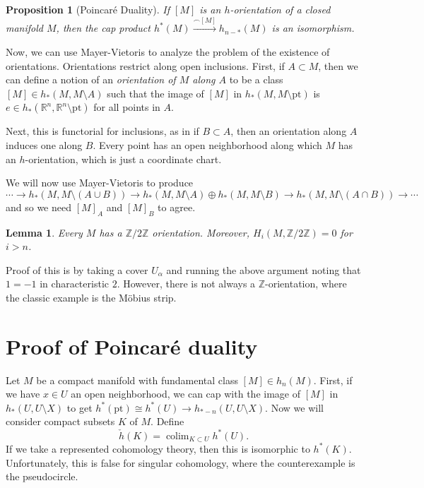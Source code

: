 \documentclass[leqno, openany]{memoir}
\newtheorem{prop}[thm]{Proposition}
\newtheorem{lem}[thm]{Lemma}
\theoremstyle{definition}
\theoremstyle{remark}
\theoremstyle{plain}
\theoremstyle{definition}
\theoremstyle{remark}
\newcommand{\R}{\mathbb{R}}
\newcommand{\Z}{\mathbb{Z}}
\newcommand{\mr}[1]{\mathrm{#1}}
\begin{document}
\begin{prop}[Poincar\'e Duality]
    If $[M]$ is an $h$-orientation of a closed manifold $M$, then the cap product $h^*(M) \xrightarrow{\frown [M]} h_{n-*}(M)$ is an isomorphism.
\end{prop}

Now, we can use Mayer-Vietoris to analyze the problem of the existence of orientations.
Orientations restrict along open inclusions. First, if $A \subset M$, then we can define a notion of an \textit{orientation of $M$ along $A$} to be a class $[M] \in h_*(M, M \setminus A)$ such that the image of $[M]$ in $h_*(M, M \setminus \mr{pt})$ is $e \in h_*(\R^n, \R^n \setminus \mr{pt})$ for all points in $A$.

Next, this is functorial for inclusions, as in if $B \subset A$, then an orientation along $A$ induces one along $B$. Every point has an open neighborhood along which $M$ has an $h$-orientation, which is just a coordinate chart. 

We will now use Mayer-Vietoris to produce
\[ \cdots \to h_*(M, M \setminus (A \cup B)) \to h_*(M, M \setminus A) \oplus h_*(M, M \setminus B) \to h_*(M, M \setminus (A \cap B)) \to \cdots \]
and so we need $[M]_A$ and $[M]_B$ to agree.

\begin{lem}
    Every $M$ has a $\Z/2\Z$ orientation. Moreover, $H_i(M, \Z/2\Z) = 0$ for $i > n$.
\end{lem}

Proof of this is by taking a cover $U_{\alpha}$ and running the above argument noting that $1 = -1$ in characteristic $2$. However, there is not always a $\Z$-orientation, where the classic example is the M\"obius strip.

\section{Proof of Poincar\'e duality}%
\label{sec:proof_of_poincar'e_duality}

Let $M$ be a compact manifold with fundamental class $[M] \in h_n(M)$. First, if we have $x \in U$ an open neighborhood, we can cap with the image of $[M]$ in $h_*(U, U \setminus X)$ to get $h^*(\mr{pt}) \cong h^*(U) \to h_{*-n}(U, U \setminus X)$. Now we will consider compact subsets $K$ of $M$. Define
\[ \check{h}(K) = \operatorname{colim}_{K \subset U} h^*(U). \]
If we take a represented cohomology theory, then this is isomorphic to $h^*(K)$. Unfortunately, this is false for singular cohomology, where the counterexample is the pseudocircle.
\end{document}
